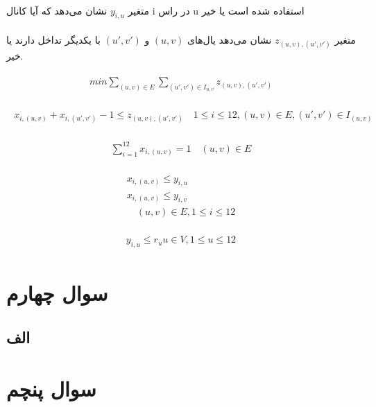 \documentclass[paper=a4, fontsize=11pt]{article}
\numberwithin{equation}{section} %
\numberwithin{figure}{section} %
\numberwithin{table}{section} %
\begin{document}
\paragraph{}
متغیر $y_{i,u}$ نشان می‌دهد
که آیا کانال i در راس u استفاده شده است یا خیر

\paragraph{}
متغیر $z_{(u,v),(u',v')}$
نشان می‌دهد یال‌های $(u,v)$ و $(u',v')$ با یکدیگر تداخل دارند یا خیر.

\begin{align}
\begin{split}
	min \sum_{(u,v) \in E}\sum_{(u',v') \in I_{u,v}} z_{(u,v),(u',v')}
\end{split}
\end{align}

\begin{align}
\begin{split}
	x_{i,(u,v)} + x_{i,(u',v')} - 1 \le z_{(u,v),(u',v')}
	\quad
	1 \le i \le 12, (u,v) \in E, (u',v') \in I_{(u,v)}
\end{split}
\end{align}

\begin{align}
\begin{split}
	\sum_{i=1}^{12} x_{i,(u,v)} = 1
	\quad (u,v) \in E
\end{split}
\end{align}

\begin{align}
\begin{split}
	x_{i,(u,v)} \le y_{i,u}\\
	x_{i,(u,v)} \le y_{i,v}\\
	\quad (u,v) \in E, 1 \le i \le 12
\end{split}
\end{align}

\begin{align}
\begin{split}
	y_{i,u} \le r_u
	u \in V, 1 \le u \le 12
\end{split}
\end{align}

\section{سوال چهارم}
\subsection{الف}



\section{سوال پنچم}
\end{document}

